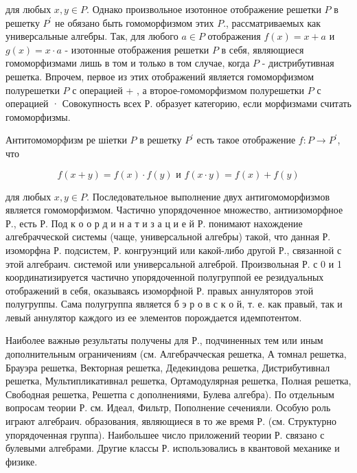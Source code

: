 \documentclass[10pt]{article}
\begin{document}
для любых $x, y \in P$. Однако произвольное изотонное отображение решетки $P$ в решетку $P^{\prime}$ не обязано быть гомоморфизмом этих $P$., рассматриваемых как универсальные алгебры. Так, для любого $a \in P$ отображения $f(x)=x+a$ и $g(x)=x \cdot a$ - изотонные отображения решетки $P$ в себя, являющиеся гомоморфизмами лишь в том и только в том случае, когда $P$ - дистрибутивная решетка. Впрочем, первое из этих отображений является гомоморфизмом полурешетки $P$ с операцией + , а второе-гомоморфизмом полурешетки $P$ с операцией · Совокупность всех Р. образует категорию, если морфизмами считать гомоморфизмы.



Антитомоморфизм ре шіетки $P$ в решетку $P^{\prime}$ есть такое отображение $f: P \rightarrow P^{\prime}$, что



\[

f(x+y)=f(x) \cdot f(y) \text { и } f(x \cdot y)=f(x)+f(y)

\]



для любых $x, y \in P$. Последовательное выполнение двух антигомоморфизмов является гомоморфизмом. Частично упорядоченное множество, антиизоморфное Р., есть Р. Под к о о р д и н а т и з а ц и е й Р. понимают нахождение алгебрачческой системы (чаще, универсальной алгебры) такой, что данная Р. изоморфна Р. подсистем, Р. конгруэнций или какой-либо другой Р., связанной с этой алгебраич. системой или универсальной алгеброй. Произвольная Р. с 0 и 1 координатизируется частично упорядоченной полугруппой ее резидуальных отображений в себя, оказываясь изоморфной Р. правых аннуляторов этой полугруппы. Сама полугруппа является б э р о в с к о й, т. е. как правый, так и левый аннулятор каждого из ее элементов порождается идемпотентом.



Наиболее важныө результаты получены для Р., подчиненных тем или иным дополнительным ограничениям (см. Алгебрачческая решетка, А томнал решетка, Брауэра решетка, Векторная решетка, Дедекиндова решетка, Дистрибутивнал решетка, Мультипликативнал решетка, Ортамодулярная решетка, Полная решетка, Свободная решетка, Решетпа с дополнениями, Булева алгебра). По отдельным вопросам теории Р. см. Идеал, Фильтр, Пополнение сеченияли. Особую роль играют алгебраич. образования, являющиеся в то же время Р. (см. Структурно упорядоченная группа). Наибольшее число приложений теории Р. связано с булевыми алгебрами. Другие классы Р. использовались в квантовой механике и физике.
\end{document}
